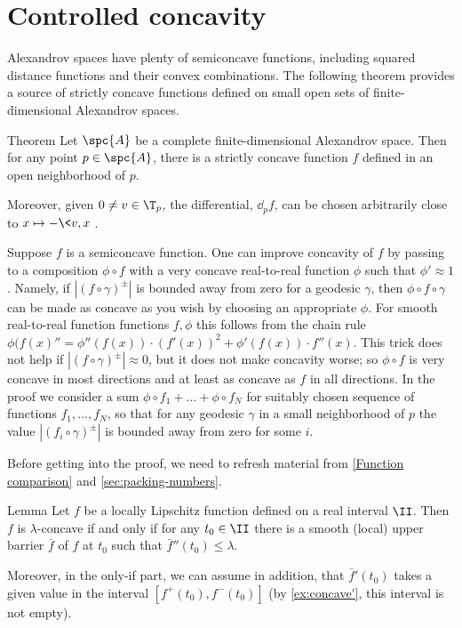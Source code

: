 \section{Controlled concavity}

Alexandrov spaces have plenty of semiconcave functions, including squared distance functions and their convex combinations.
The following theorem provides a source of strictly concave functions  defined on small open sets of finite-dimensional Alexandrov spaces. 

\begin{thm}{Theorem}
\label{thm:strictly-concave}
Let $\spc{A}$ be a complete finite-dimensional Alexandrov  space.
Then for any point $p\in \spc{A}$, there is  a strictly concave function $f$ defined in an
open neighborhood of $p$.

Moreover, given $0\ne v\in \T_p$, the differential, $\dd_p f$, can be chosen
arbitrarily close to $x\mapsto -\<v,x\>$.
\end{thm}

Suppose $f$ is a semiconcave function.
One can improve concavity of $f$ by passing to a composition $\phi\circ f$ with a very concave real-to-real function $\phi$ such that $\phi'\approx 1$.
Namely, if $|(f\circ\gamma)^\pm|$ is bounded away from zero for a geodesic $\gamma$, then $\phi\circ f\circ\gamma$ can be made as concave as you wish by choosing an appropriate $\phi$.
For smooth real-to-real function  functions  $f, \phi$ this follows from the chain rule $\phi(f(x)''=\phi''(f(x))\cdot (f'(x))^2+\phi'(f(x)) \cdot f''(x)$.
This trick does not help if $|(f\circ\gamma)^\pm|\approx 0$, but it does not make concavity worse;
so $\phi\circ f$ is very concave in most directions and at least as concave as $f$ in all directions.
In the proof we consider a sum $\phi\circ f_1+\ldots+\phi\circ f_N$ for suitably chosen sequence of functions $f_1,\ldots,f_N$, so that for any geodesic $\gamma$ in a small neighborhood of $p$ the value $|(f_i\circ\gamma)^\pm|$ is bounded away from zero for some $i$.

\medskip

Before getting into the proof, we need to refresh material from \ref{Function comparison} and \ref{sec:packing-numbers}.

\begin{thm}{Lemma}\label{lem:barrier}
Let $f$ be a locally Lipschitz function defined on a real interval $\II$.
Then $f$ is $\lambda$-concave if and only if for any $t_0\in\II$ there is a smooth (local) upper barrier
$\bar f$ of $f$ at $t_0$ such that $\bar f''(t_0)\le \lambda$.

Moreover, in the only-if part, we can assume in addition, that $\bar f'(t_0)$ takes a given value in the interval $[f^+(t_0),f^-(t_0)]$ (by \ref{ex:concave'}, this interval is not empty).
\end{thm}

